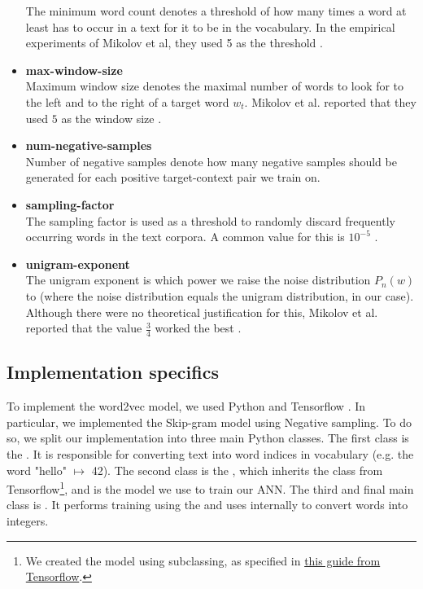 \begin{itemize}
        The minimum word count denotes a threshold of how many times a word at least has to occur in a text for it to be in the vocabulary. In the empirical experiments of Mikolov et al, they used 5 as the threshold \cite{mikolov2013b}.
    \item \textbf{max-window-size} \\
        Maximum window size denotes the maximal number of words to look for to the left and to the right of a target word $w_t$. Mikolov et al. reported that they used $5$ as the window size \cite{mikolov2013b}.
    \item \textbf{num-negative-samples} \\
        Number of negative samples denote how many negative samples should be generated for each positive target-context pair we train on.
    \item \textbf{sampling-factor} \\
        The sampling factor is used as a threshold to randomly discard frequently occurring words in the text corpora. A common value for this is $10^{-5}$ \cite{mikolov2013b}.
    \item \textbf{unigram-exponent} \\
        The unigram exponent is which power we raise the noise distribution $P_n(w)$ to (where the noise distribution equals the unigram distribution, in our case). Although there were no theoretical justification for this, Mikolov et al. reported that the value $\frac{3}{4}$ worked the best \cite{mikolov2013b}.
\end{itemize}

\subsection{Implementation specifics}
To implement the word2vec model, we used Python and Tensorflow \cite{python3-2009, tensorflow2015-whitepaper}. In particular, we implemented the Skip-gram model using Negative sampling. To do so, we split our implementation into three main Python classes. The first class is the . It is responsible for converting text into word indices in vocabulary (e.g. the word "hello" $\mapsto$ 42). The second class is the , which inherits the  class from Tensorflow\footnote{We created the model using subclassing, as specified in \href{https://www.tensorflow.org/guide/keras/custom_layers_and_models}{this guide from Tensorflow}.}, and is the model we use to train our ANN. The third and final main class is . It performs training using the  and uses  internally to convert words into integers.


